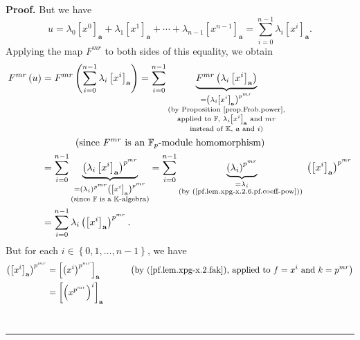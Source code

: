 \documentclass[numbers=enddot,12pt,final,onecolumn,notitlepage]{scrartcl}%
\theoremstyle{definition}
\newenvironment{proof}[1][Proof]{\noindent\textbf{#1.} }{\ \rule{0.5em}{0.5em}}
\let\sumnonlimits\sum
\renewcommand{\sum}{\sumnonlimits\limits}
\begin{document}
\begin{proof}
But we have%
\begin{equation}
u=\lambda_{0}\left[  x^{0}\right]  _{\mathbf{a}}+\lambda_{1}\left[
x^{1}\right]  _{\mathbf{a}}+\cdots+\lambda_{n-1}\left[  x^{n-1}\right]
_{\mathbf{a}}=\sum_{i=0}^{n-1}\lambda_{i}\left[  x^{i}\right]  _{\mathbf{a}}.
\label{pf.lem.xpg-x.2.6.pf.1}%
\end{equation}
Applying the map $F^{mr}$ to both sides of this equality, we obtain%
\begin{align}
F^{mr}\left(  u\right)   &  =F^{mr}\left(  \sum_{i=0}^{n-1}\lambda_{i}\left[
x^{i}\right]  _{\mathbf{a}}\right)  =\sum_{i=0}^{n-1}\underbrace{F^{mr}\left(
\lambda_{i}\left[  x^{i}\right]  _{\mathbf{a}}\right)  }_{\substack{=\left(
\lambda_{i}\left[  x^{i}\right]  _{\mathbf{a}}\right)  ^{p^{mr}}\\\text{(by
Proposition \ref{prop.Frob.power},}\\\text{applied to }\mathbb{F}\text{,
$\lambda_{i}$}\left[  x^{i}\right]  _{\mathbf{a}}\text{ and }mr\\\text{instead
of }\mathbb{K}\text{, }a\text{ and }i\text{)}}}\nonumber\\
&  \ \ \ \ \ \ \ \ \ \ \left(  \text{since }F^{mr}\text{ is an }\mathbb{F}%
_{p}\text{-module homomorphism}\right) \nonumber\\
&  =\sum_{i=0}^{n-1}\underbrace{\left(  \lambda_{i}\left[  x^{i}\right]
_{\mathbf{a}}\right)  ^{p^{mr}}}_{\substack{=\left(  \lambda_{i}\right)
^{p^{mr}}\left(  \left[  x^{i}\right]  _{\mathbf{a}}\right)  ^{p^{mr}%
}\\\text{(since }\mathbb{F}\text{ is a }\mathbb{K}\text{-algebra)}}%
}=\sum_{i=0}^{n-1}\underbrace{\left(  \lambda_{i}\right)  ^{p^{mr}}%
}_{\substack{=\lambda_{i}\\\text{(by (\ref{pf.lem.xpg-x.2.6.pf.coeff-pow})) }%
}}\left(  \left[  x^{i}\right]  _{\mathbf{a}}\right)  ^{p^{mr}}\nonumber\\
&  =\sum_{i=0}^{n-1}\lambda_{i}\left(  \left[  x^{i}\right]  _{\mathbf{a}%
}\right)  ^{p^{mr}}. \label{pf.lem.xpg-x.2.6.pf.2}%
\end{align}
But for each $i\in\left\{  0,1,\ldots,n-1\right\}  $, we have%
\begin{align}
\left(  \left[  x^{i}\right]  _{\mathbf{a}}\right)  ^{p^{mr}}  &  =\left[
\left(  x^{i}\right)  ^{p^{mr}}\right]  _{\mathbf{a}}%
\ \ \ \ \ \ \ \ \ \ \left(  \text{by (\ref{pf.lem.xpg-x.2.fak}), applied to
}f=x^{i}\text{ and }k=p^{mr}\right) \nonumber\\
&  =\left[  \left(  x^{p^{mr}}\right)  ^{i}\right]  _{\mathbf{a}%
}
\end{align}
\end{proof}
\end{document}
